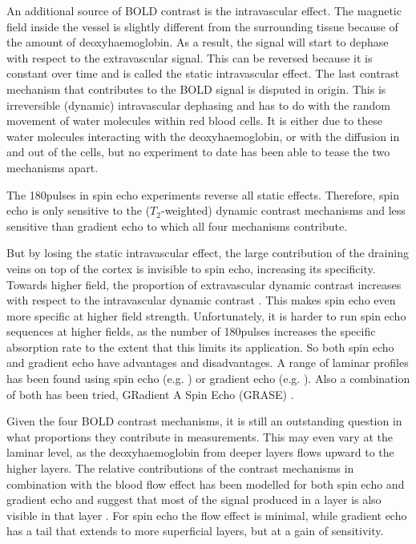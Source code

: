 An additional source of BOLD contrast is the intravascular effect. The magnetic field inside the vessel is slightly different from the surrounding tissue because of the amount of deoxyhaemoglobin. As a result, the signal will start to dephase with respect to the extravascular signal. This can be reversed because it is constant over time and is called the static intravascular effect. The last contrast mechanism that contributes to the BOLD signal is disputed in origin. This is irreversible (dynamic) intravascular dephasing and has to do with the random movement of water molecules within red blood cells. It is either due to these water molecules interacting with the deoxyhaemoglobin, or with the diffusion in and out of the cells, but no experiment to date has been able to tease the two mechanisms apart.

The 180\textdegree pulses in spin echo experiments reverse all static effects. Therefore, spin echo is only sensitive to the ($T_2$-weighted) dynamic contrast mechanisms and less sensitive than gradient echo to which all four mechanisms contribute. 

But by losing the static intravascular effect, the large contribution of the draining veins on top of the cortex is invisible to spin echo, increasing its specificity. Towards higher field, the proportion of extravascular dynamic contrast increases with respect to the intravascular dynamic contrast \cite{Norris2002,Jochimsen2004,Norris2006}. This makes spin echo even more specific at higher field strength. Unfortunately, it is harder to run spin echo sequences at higher fields, as the number of 180\textdegree pulses increases the specific absorption rate to the extent that this limits its application. So both spin echo and gradient echo have advantages and disadvantages. A range of laminar profiles has been found using spin echo (e.g. \cite{Zhao2004,Harel2006,Goense2006}) or gradient echo (e.g. \cite{Polimeni2010,DeMartino2013,Chen2013}). Also a combination of both has been tried, GRadient A Spin Echo (GRASE) \cite{Olman2012,DeMartino2013}.

Given the four BOLD contrast mechanisms, it is still an outstanding question in what proportions they contribute in measurements. This may even vary at the laminar level, as the deoxyhaemoglobin from deeper layers flows upward to the higher layers. The relative contributions of the contrast mechanisms in combination with the blood flow effect has been modelled for both spin echo and gradient echo and suggest that most of the signal produced in a layer is also visible in that layer \cite{Markuerkiaga2016,Uludag2017}. For spin echo the flow effect is minimal, while gradient echo has a tail that extends to more superficial layers, but at a gain of sensitivity. 

